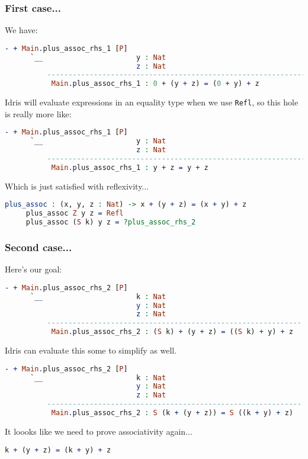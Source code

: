 \documentclass{beamer}
\begin{document}
\begin{frame}[fragile]
  \frametitle{First case...}

  We have:

  \begin{lstlisting}[language=Idris]
     - + Main.plus_assoc_rhs_1 [P]
      `__                      y : Nat
                               z : Nat
          ---------------------------------------------------------------
           Main.plus_assoc_rhs_1 : 0 + (y + z) = (0 + y) + z
  \end{lstlisting}

  \pause
  Idris will evaluate expressions in an equality type when we use
  \texttt{Refl}, so this hole is really more like:

  \begin{lstlisting}[language=Idris]
     - + Main.plus_assoc_rhs_1 [P]
      `__                      y : Nat
                               z : Nat
          ---------------------------------------------------------------
           Main.plus_assoc_rhs_1 : y + z = y + z
  \end{lstlisting}

  \pause
  Which is just satisfied with reflexivity...

  \begin{lstlisting}[language=Idris]
     plus_assoc : (x, y, z : Nat) -> x + (y + z) = (x + y) + z
     plus_assoc Z y z = Refl
     plus_assoc (S k) y z = ?plus_assoc_rhs_2
  \end{lstlisting}
\end{frame}

\begin{frame}[fragile]
  \frametitle{Second case...}

  Here's our goal:

  \begin{lstlisting}[language=Idris]
     - + Main.plus_assoc_rhs_2 [P]
      `__                      k : Nat
                               y : Nat
                               z : Nat
          ------------------------------------------------------------
           Main.plus_assoc_rhs_2 : (S k) + (y + z) = ((S k) + y) + z
  \end{lstlisting}

  \pause
  Idris can evaluate this some to simplify as well.

  \begin{lstlisting}[language=Idris]
     - + Main.plus_assoc_rhs_2 [P]
      `__                      k : Nat
                               y : Nat
                               z : Nat
          ------------------------------------------------------------
           Main.plus_assoc_rhs_2 : S (k + (y + z)) = S ((k + y) + z)
  \end{lstlisting}

  It loooks like we need to prove associativity again...

  \pause
  \begin{lstlisting}[language=Idris]
    k + (y + z) = (k + y) + z
  \end{lstlisting}
\end{frame}
\end{document}
